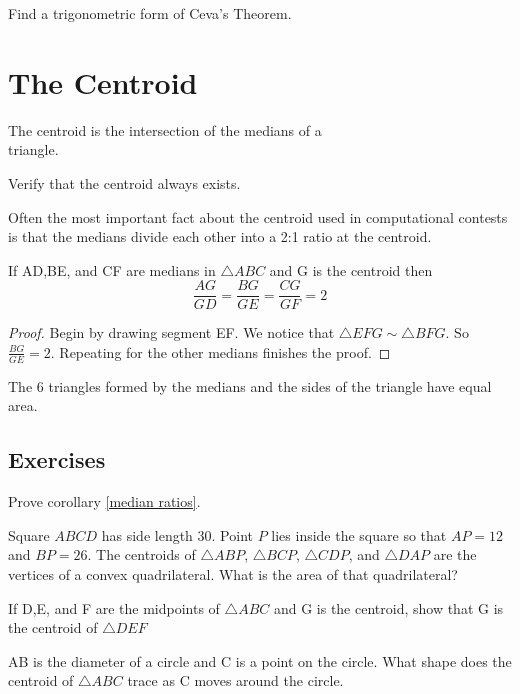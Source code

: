 \documentclass[11pt]{scrartcl}
\theoremstyle{plain}
\begin{document}
    \begin{exercise}
        Find a trigonometric form of Ceva's Theorem.
    \end{exercise}
    
\section{The Centroid}
    
        \begin{definition}
            The centroid is the intersection of the medians of a \\triangle.
       \end{definition} 
    
       
    \begin{exercise}
        Verify that the centroid always exists.
    \end{exercise}
    Often the most important fact about the centroid used in computational
    contests is that the medians divide each other into a 2:1 ratio at the centroid.
    
        \begin{theorem}
            If AD,BE, and CF are medians in $\triangle ABC$ and G is the centroid then $$\frac{AG}{GD}=\frac{BG}{GE}=\frac{CG}{GF}=2$$
        \end{theorem}
    
    \begin{proof}
        Begin by drawing segment EF. We notice that $\triangle EFG \sim \triangle BFG$.
        So $\frac{BG}{GE} =2$. Repeating for the other medians finishes the proof.
    \end{proof}
    
        \begin{corollary}
        \label{median ratios}
            The 6 triangles formed by the medians and the sides of the triangle have equal area.
        \end{corollary}
    
    \subsection*{Exercises}
    \begin{exercise}
        Prove corollary \ref{median ratios}.
    \end{exercise}
    \begin{exercise}[2018 AMC]
        Square $ABCD$ has side length $30$. Point $P$ lies inside the square so that $AP = 12$ and $BP = 26$. The centroids of $\triangle{ABP}$, $\triangle{BCP}$, $\triangle{CDP}$, and $\triangle{DAP}$ are the vertices of a convex quadrilateral. What is the area of that quadrilateral?
    \end{exercise}
    \begin{exercise} If D,E, and F are the midpoints of $\triangle ABC$ and G is the centroid, show that G is the centroid of $\triangle DEF$
    \end{exercise}
    \begin{exercise} AB is the diameter of a circle and C is a point on the circle. What shape does the centroid of $\triangle ABC$ trace as C moves around the circle.
    \end{exercise}
\end{document}
